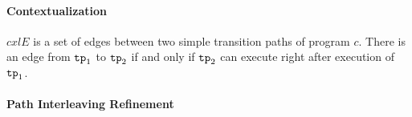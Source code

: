 \paragraph{Contextualization}

$cxlE$ is a set of edges between two simple transition paths of program $c$. There is an edge from $\mathtt{tp}_1$ to $\mathtt{tp}_2$
if and only if $\mathtt{tp}_2$ can execute right after execution of $\mathtt{tp}_1$.

\paragraph{Path Interleaving Refinement}

